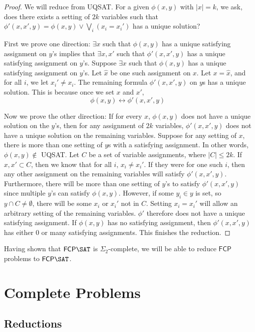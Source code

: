 \documentclass[runningheads,a4paper]{llncs}
\begin{document}
\begin{proof}
We will reduce from UQSAT. For a given $\phi(x, y)$ with $|x| = k$, we ask, does there exists a setting of $2k$ variables such that $\phi'(x, x', y) = \phi(x, y) \vee \bigvee_i (x_i = x_i')$ has a unique solution?

First we prove one direction: $\exists x$ such that $\phi(x,y)$ has a unique satisfying assignment on $y$'s implies that $\exists x, x'$ such that $\phi'(x,x',y)$ has a unique satisfying assignment on $y$'s.
Suppose $\exists x$ such that $\phi(x,y)$ has a unique satisfying assignment on $y$'s. Let $\hat{x}$ be one such assignment on $x$. Let $x = \hat{x}$, and for all $i$, we let $x_i' \neq x_i$. The remaining formula $\phi'(x, x', y)$ on $y$s has a unique solution. This is because once we set $x$ and $x'$, 
\[ \phi(x, y) \leftrightarrow \phi'(x,x',y) \]

Now we prove the other direction: If for every $x$, $\phi(x,y)$ does not have a unique solution on the $y$'s, then for any assignment of $2k$ variables, $\phi'(x,x',y)$ does not have a unique solution on the remaining variables. 
Suppose for any setting of $x$, there is more than one setting of $y$s with a satisfying assignment. In other words, $\phi(x, y) \notin$ UQSAT. Let $C$ be a set of variable assignments, where $|C| \leq 2k$. If $x, x' \subset C$, then we know that for all $i$, $x_i \neq x_i'$. If they were for one such $i$, then any other assignment on the remaining variables will satisfy $\phi'(x,x',y)$. Furthermore, there will be more than one setting of $y$'s to satisfy $\phi'(x,x',y)$ since multiple $y$'s can satisfy $\phi(x,y)$. However, if some $y_i \in y$ is set, so $y \cap C \neq \emptyset$, there will be some $x_i$ or $x_i'$ not in $C$. Setting $x_i = x_i'$ will allow an arbitrary setting of the remaining variables. $\phi'$ therefore does not have a unique satisfying assignment. If $\phi(x,y)$ has no satisfying assignment, then $\phi'(x,x',y)$ has either 0 or many satisfying assignments. This finishes the reduction.
\end{proof}

Having shown that $\mathsf{FCP} \SAT$ is $\Sigma_2$-complete, we will be able to reduce $\mathsf{FCP}$ problems to $\mathsf{FCP} \SAT$.

\section{Complete Problems}
\label{sec:The Problems}

\subsection{Reductions}
\end{document}
